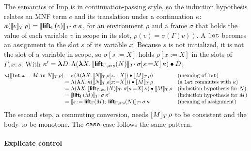 The semantics of Imp is in continuation-passing style, so the
induction hypothesis relates an MNF term $e$ and its translation under
a continuation $\kappa$: $\kappa(\llbracket e \rrbracket_T\,\rho) =
\llbracket \textsf{\bfseries lift}_\Gamma(e) \rrbracket_{T'}\,\sigma\,\kappa$, for an environment
$\rho$ and a frame $\sigma$ that holds the value of each variable $v$
in scope in its slot, $\rho(v) = \sigma(\Gamma(v))$. A $\mathtt{let}$
becomes an assignment to the slot $s$ of its variable $x$. Because $s$
is not initialized, it is not the slot of a variable in scope, so
$\sigma[s{:=}X]$ holds $\rho[x{:=}X]$ in the slots of $\Gamma, x{:}s$.
With $\kappa' = \boldsymbol{\lambda} D.\,
\Lambda(\boldsymbol{\lambda} X.\, \llbracket \textsf{\bfseries lift}_{\Gamma,x:s}(N) \rrbracket_{T'}\,\sigma[s{:=}X]\,\kappa) \mathbin{\bullet}
D$:
{\small
\[
\begin{array}{@{}r@{\;}c@{\;}l@{\quad}l@{}}
  \kappa(\den{\kw{let}\;x = M\;\kw{in}\;N}_T\,\rho)
    & = & \kappa(\Lambda(\mlam{X} \den{N}_T\,\rho[x{:=}X]) \app \den{M}_T\,\rho) & \text{(meaning of $\kw{let}$)}\\
    & = & \Lambda(\mlam{X} \kappa(\den{N}_T\,\rho[x{:=}X])) \app \den{M}_T\,\rho & \text{(a $\kw{let}$ commutes with $\kappa$)}\\
    & = & \Lambda(\mlam{X} \den{\pass{lift}_{\Gamma,x:s}(N)}_{T'}\,\sigma[s{:=}X]\,\kappa) \app \den{M}_T\,\rho & \text{(induction hypothesis for $N$)}\\
    & = & \den{\pass{lift}_\Gamma(M)}_{T'}\,\sigma\,\kappa' & \text{(induction hypothesis for $M$)}\\
    & = & \den{s \mathrel{:=} \pass{lift}_\Gamma(M);\; \pass{lift}_{\Gamma,x:s}(N)}_{T'}\,\sigma\,\kappa & \text{(meaning of assignment)}
\end{array}
\]}
The second step, a commuting conversion, needs $\llbracket M \rrbracket_T\,\rho$ to be
consistent and the body to be monotone. The $\mathtt{case}$ case follows
the same pattern.

\paragraph{Explicate control}

